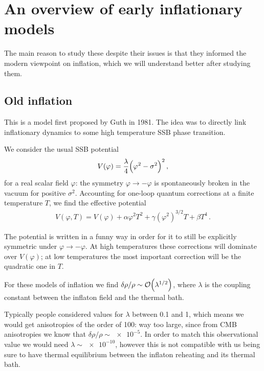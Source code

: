 \documentclass[main.tex]{subfiles}
\begin{document}
\section{An overview of early inflationary models}


The main reason to study these despite their issues is that they informed the modern viewpoint on inflation, which we will understand better after studying them.

\subsection{Old inflation}

This is a model first proposed by Guth in 1981.
The idea was to directly link inflationary dynamics to some high temperature SSB phase transition. 

We consider the usual SSB potential  
%
\begin{align}
V(\varphi ) = \frac{\lambda}{4} \qty(\varphi^2 - \sigma^2)^2
\,,
\end{align}
%
for a real scalar field \(\varphi \): the symmetry \(\varphi \to -\varphi \) is spontaneously broken in the vacuum for positive \(\sigma^2\). 
Accounting for one-loop quantum corrections at a finite temperature \(T\), we find the effective potential 
%
\begin{align}
V(\varphi , T) = V(\varphi ) 
+ \alpha  \varphi^2 T^2
+ \gamma (\varphi^2)^{3/2} T
+ \beta T^{4} 
\,.
\end{align}

The potential is written in a funny way in order for it to still be explicitly symmetric under \(\varphi \to - \varphi \).  
At high temperatures these corrections will dominate over \(V(\varphi )\); at low temperatures the most important correction will be the quadratic one in \(T\). 


For these models of inflation we find \(\delta \rho / \rho \sim \order{\lambda^{1/2}}\), where \(\lambda \) is the coupling constant between the inflaton field and the thermal bath.

Typically people considered values for \(\lambda \) between \num{.1} and \num{1}, which means we would get anisotropies of the order of 100:
way too large, since from CMB anisotropies we know that \(\delta \rho / \rho \sim \num{e-5}\).
In order to match this observational value we would need \(\lambda \sim \num{e-10}\), however this is not compatible with us being sure to have thermal equilibrium between the inflaton reheating and its thermal bath. 
\end{document}
